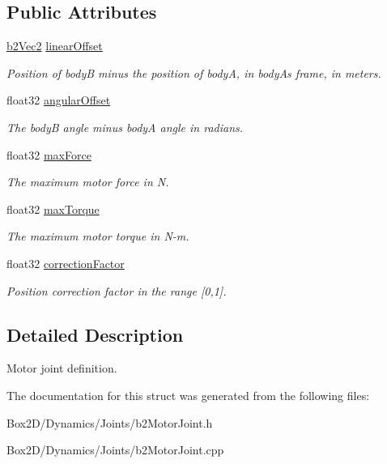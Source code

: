 \subsection*{Public Attributes}
\begin{DoxyCompactItemize}
\item 
\mbox{\label{structb2_motor_joint_def_a2c957cffc2af66c6c8077c069b906bc4}} 
\hyperlink{structb2_vec2}{b2\+Vec2} \hyperlink{structb2_motor_joint_def_a2c957cffc2af66c6c8077c069b906bc4}{linear\+Offset}
\begin{DoxyCompactList}\small\item\em Position of bodyB minus the position of bodyA, in bodyA\textquotesingle{}s frame, in meters. \end{DoxyCompactList}\item 
\mbox{\label{structb2_motor_joint_def_abdb42eff4aeff1d48038e084c57e1cb0}} 
float32 \hyperlink{structb2_motor_joint_def_abdb42eff4aeff1d48038e084c57e1cb0}{angular\+Offset}
\begin{DoxyCompactList}\small\item\em The bodyB angle minus bodyA angle in radians. \end{DoxyCompactList}\item 
\mbox{\label{structb2_motor_joint_def_a2f66d1b99c654e112dc68e15375d5ee7}} 
float32 \hyperlink{structb2_motor_joint_def_a2f66d1b99c654e112dc68e15375d5ee7}{max\+Force}
\begin{DoxyCompactList}\small\item\em The maximum motor force in N. \end{DoxyCompactList}\item 
\mbox{\label{structb2_motor_joint_def_afcf5dd58166917a4574d1f28f6bb3660}} 
float32 \hyperlink{structb2_motor_joint_def_afcf5dd58166917a4574d1f28f6bb3660}{max\+Torque}
\begin{DoxyCompactList}\small\item\em The maximum motor torque in N-\/m. \end{DoxyCompactList}\item 
\mbox{\label{structb2_motor_joint_def_ab282afdb92d07ead23530f57fd0eb9ea}} 
float32 \hyperlink{structb2_motor_joint_def_ab282afdb92d07ead23530f57fd0eb9ea}{correction\+Factor}
\begin{DoxyCompactList}\small\item\em Position correction factor in the range \mbox{[}0,1\mbox{]}. \end{DoxyCompactList}\end{DoxyCompactItemize}


\subsection{Detailed Description}
Motor joint definition. 

The documentation for this struct was generated from the following files\+:\begin{DoxyCompactItemize}
\item 
Box2\+D/\+Dynamics/\+Joints/b2\+Motor\+Joint.\+h\item 
Box2\+D/\+Dynamics/\+Joints/b2\+Motor\+Joint.\+cpp\end{DoxyCompactItemize}
